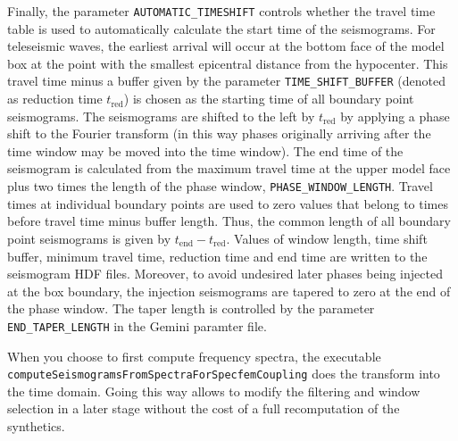 Finally, the parameter \verb+AUTOMATIC_TIMESHIFT+ controls whether the travel time table is used to automatically calculate the start time of the seismograms. For teleseismic waves, the earliest arrival will occur at the bottom face of the model box at the point with the smallest epicentral distance from the hypocenter. This travel time minus a buffer given by the parameter  \verb+TIME_SHIFT_BUFFER+ (denoted as reduction time $t_\mathrm{red}$) is chosen as the starting time of all boundary point seismograms. The seismograms are shifted to the left by $t_\mathrm{red}$ by applying a phase shift to the Fourier transform (in this way phases originally arriving after the time window may be moved into the time window). The end time of the seismogram is calculated from the maximum travel time at the upper model face plus two times the length of the phase window, \verb+PHASE_WINDOW_LENGTH+. Travel times at individual boundary points are used to zero values that belong to times before travel time minus buffer length. Thus, the common length of all boundary point seismograms is given by $t_\mathrm{end}-t_\mathrm{red}$. Values of window length, time shift buffer, minimum travel time, reduction time and end time are written to the seismogram HDF files.
Moreover, to avoid undesired later phases being injected at the box boundary, the injection seismograms are tapered to zero at the end of the phase window. The taper length is controlled by the parameter \verb+END_TAPER_LENGTH+ in the Gemini paramter file.

 When you choose to first compute frequency spectra, the executable \\ \verb+computeSeismogramsFromSpectraForSpecfemCoupling+ does the transform into the time domain. Going this way allows to modify the filtering and window selection in a later stage without the cost of a full recomputation of the synthetics.

